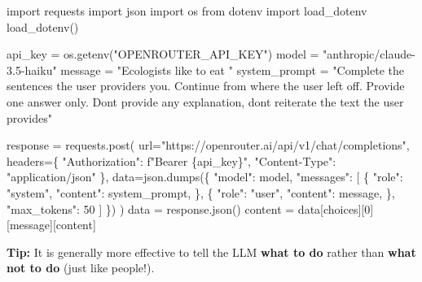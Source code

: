 \documentclass[
  letterpaper,
  DIV=11,
  numbers=noendperiod]{scrreprt}
\newenvironment{Shaded}{\begin{snugshade}}{\end{snugshade}}
\newcommand{\DecValTok}[1]{\textcolor[rgb]{0.68,0.00,0.00}{#1}}
\newcommand{\ImportTok}[1]{\textcolor[rgb]{0.00,0.46,0.62}{#1}}
\newcommand{\NormalTok}[1]{\textcolor[rgb]{0.00,0.23,0.31}{#1}}
\newcommand{\OperatorTok}[1]{\textcolor[rgb]{0.37,0.37,0.37}{#1}}
\newcommand{\SpecialCharTok}[1]{\textcolor[rgb]{0.37,0.37,0.37}{#1}}
\newcommand{\SpecialStringTok}[1]{\textcolor[rgb]{0.13,0.47,0.30}{#1}}
\newcommand{\StringTok}[1]{\textcolor[rgb]{0.13,0.47,0.30}{#1}}
\begin{document}
\begin{Shaded}
\begin{Highlighting}[]
\ImportTok{import}\NormalTok{ requests}
\ImportTok{import}\NormalTok{ json}
\ImportTok{import}\NormalTok{ os}
\ImportTok{from}\NormalTok{ dotenv }\ImportTok{import}\NormalTok{ load\_dotenv}
\NormalTok{load\_dotenv()}

\NormalTok{api\_key }\OperatorTok{=}\NormalTok{ os.getenv(}\StringTok{"OPENROUTER\_API\_KEY"}\NormalTok{)}
\NormalTok{model }\OperatorTok{=} \StringTok{"anthropic/claude{-}3.5{-}haiku"}
\NormalTok{message }\OperatorTok{=} \StringTok{"Ecologists like to eat "}
\NormalTok{system\_prompt }\OperatorTok{=} \StringTok{"Complete the sentences the user providers you. Continue from where the user left off. Provide one answer only. Don\textquotesingle{}t provide any explanation, don\textquotesingle{}t reiterate the text the user provides"}

\NormalTok{response }\OperatorTok{=}\NormalTok{ requests.post(}
\NormalTok{  url}\OperatorTok{=}\StringTok{"https://openrouter.ai/api/v1/chat/completions"}\NormalTok{,}
\NormalTok{  headers}\OperatorTok{=}\NormalTok{\{}
    \StringTok{"Authorization"}\NormalTok{: }\SpecialStringTok{f"Bearer }\SpecialCharTok{\{}\NormalTok{api\_key}\SpecialCharTok{\}}\SpecialStringTok{"}\NormalTok{,}
    \StringTok{"Content{-}Type"}\NormalTok{: }\StringTok{"application/json"}
\NormalTok{  \},}
\NormalTok{  data}\OperatorTok{=}\NormalTok{json.dumps(\{}
    \StringTok{"model"}\NormalTok{: model,}
    \StringTok{"messages"}\NormalTok{: [}
\NormalTok{      \{}
        \StringTok{"role"}\NormalTok{: }\StringTok{"system"}\NormalTok{,}
        \StringTok{"content"}\NormalTok{: system\_prompt,}
\NormalTok{      \},}
\NormalTok{      \{}
        \StringTok{"role"}\NormalTok{: }\StringTok{"user"}\NormalTok{,}
        \StringTok{"content"}\NormalTok{: message,}
\NormalTok{      \},}
    \StringTok{"max\_tokens"}\NormalTok{: }\DecValTok{50}
\NormalTok{    ]}
\NormalTok{  \})}
\NormalTok{)}
\NormalTok{data }\OperatorTok{=}\NormalTok{ response.json()}
\NormalTok{content }\OperatorTok{=}\NormalTok{ data[}\StringTok{\textquotesingle{}choices\textquotesingle{}}\NormalTok{][}\DecValTok{0}\NormalTok{][}\StringTok{\textquotesingle{}message\textquotesingle{}}\NormalTok{][}\StringTok{\textquotesingle{}content\textquotesingle{}}\NormalTok{]}
\end{Highlighting}
\end{Shaded}

\textbf{Tip:} It is generally more effective to tell the LLM
\textbf{what to do} rather than \textbf{what not to do} (just like
people!).
\end{document}

